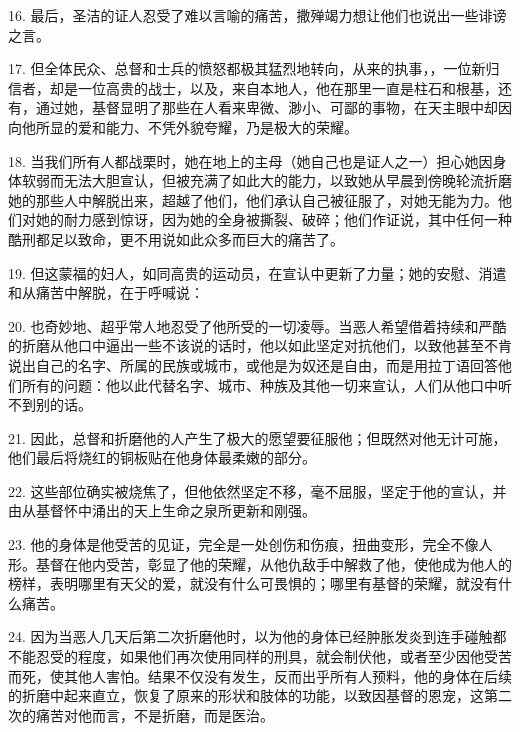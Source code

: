 16. 最后，圣洁的证人忍受了难以言喻的痛苦，撒殚竭力想让他们也说出一些诽谤之言。\par

17. 但全体民众、总督和士兵的愤怒都极其猛烈地转向，从来的执事，，一位新归信者，却是一位高贵的战士，以及，来自本地人，他在那里一直是柱石和根基，还有，通过她，基督显明了那些在人看来卑微、渺小、可鄙的事物，在天主眼中却因向他所显的爱和能力、不凭外貌夸耀，乃是极大的荣耀。\par

18. 当我们所有人都战栗时，她在地上的主母（她自己也是证人之一）担心她因身体软弱而无法大胆宣认，但被充满了如此大的能力，以致她从早晨到傍晚轮流折磨她的那些人中解脱出来，超越了他们，他们承认自己被征服了，对她无能为力。他们对她的耐力感到惊讶，因为她的全身被撕裂、破碎；他们作证说，其中任何一种酷刑都足以致命，更不用说如此众多而巨大的痛苦了。\par

19. 但这蒙福的妇人，如同高贵的运动员，在宣认中更新了力量；她的安慰、消遣和从痛苦中解脱，在于呼喊说：\par

20. 也奇妙地、超乎常人地忍受了他所受的一切凌辱。当恶人希望借着持续和严酷的折磨从他口中逼出一些不该说的话时，他以如此坚定对抗他们，以致他甚至不肯说出自己的名字、所属的民族或城市，或他是为奴还是自由，而是用拉丁语回答他们所有的问题：他以此代替名字、城市、种族及其他一切来宣认，人们从他口中听不到别的话。\par

21. 因此，总督和折磨他的人产生了极大的愿望要征服他；但既然对他无计可施，他们最后将烧红的铜板贴在他身体最柔嫩的部分。\par

22. 这些部位确实被烧焦了，但他依然坚定不移，毫不屈服，坚定于他的宣认，并由从基督怀中涌出的天上生命之泉所更新和刚强。\par

23. 他的身体是他受苦的见证，完全是一处创伤和伤痕，扭曲变形，完全不像人形。基督在他内受苦，彰显了他的荣耀，从他仇敌手中解救了他，使他成为他人的榜样，表明哪里有天父的爱，就没有什么可畏惧的；哪里有基督的荣耀，就没有什么痛苦。\par

24. 因为当恶人几天后第二次折磨他时，以为他的身体已经肿胀发炎到连手碰触都不能忍受的程度，如果他们再次使用同样的刑具，就会制伏他，或者至少因他受苦而死，使其他人害怕。结果不仅没有发生，反而出乎所有人预料，他的身体在后续的折磨中起来直立，恢复了原来的形状和肢体的功能，以致因基督的恩宠，这第二次的痛苦对他而言，不是折磨，而是医治。\par

